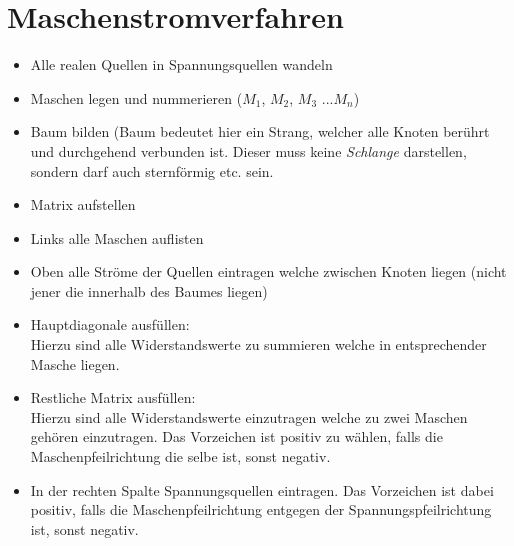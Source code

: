



\section{Maschenstromverfahren}

\begin{itemize}
	\item Alle realen Quellen in Spannungsquellen wandeln
	\item Maschen legen und nummerieren ($M_1$, $M_2$, $M_3$ ...$M_n$)
	\item Baum bilden (Baum bedeutet hier ein Strang, welcher alle Knoten berührt und durchgehend verbunden ist. Dieser muss keine \textit{Schlange} darstellen, sondern darf auch sternförmig etc. sein.
	\item Matrix aufstellen
	\item Links alle Maschen auflisten
	\item Oben alle Ströme der Quellen eintragen welche zwischen Knoten liegen (nicht jener die innerhalb des Baumes liegen)
	\item Hauptdiagonale ausfüllen:\\ Hierzu sind alle Widerstandswerte zu summieren welche in entsprechender Masche liegen.
	\item Restliche Matrix ausfüllen:\\ Hierzu sind alle Widerstandswerte einzutragen welche zu zwei Maschen gehören einzutragen. Das Vorzeichen ist positiv zu wählen, falls die Maschenpfeilrichtung die selbe ist, sonst negativ.
	\item In der rechten Spalte Spannungsquellen eintragen. Das Vorzeichen ist dabei positiv, falls die Maschenpfeilrichtung entgegen der Spannungspfeilrichtung ist, sonst negativ.
\end{itemize}

